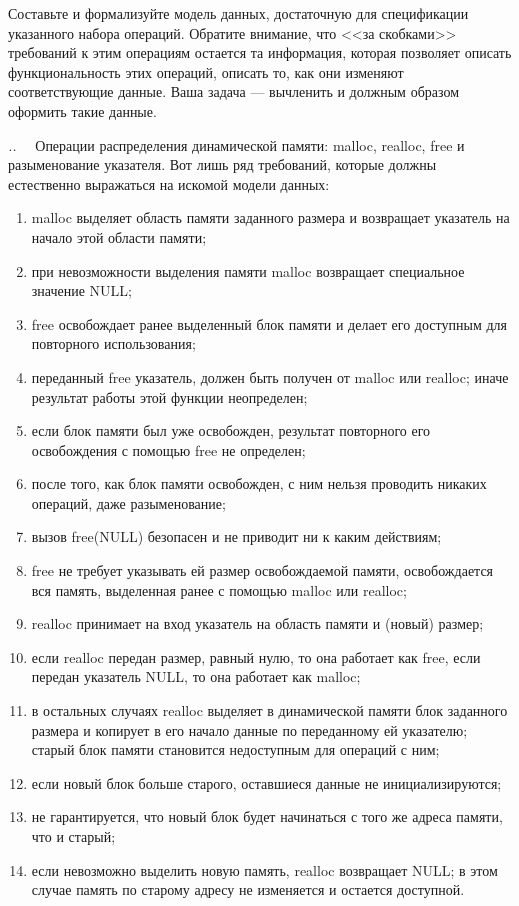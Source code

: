 \documentclass[14pt, twoside]{extreport}
\newcounter{problem_type}[chapter]
\newcounter{zadacha}[problem_type]
\newcommand{\z}{\vspace{0.5cm}\par\addtocounter{zadacha}{1}%
\textit{\arabic{chapter}.\arabic{problem_type}.\arabic{zadacha}}~~  }
\begin{document}
Составьте и формализуйте модель данных, достаточную для спецификации указанного набора операций. Обратите внимание, что <<за скобками>> требований к этим операциям остается та информация, которая позволяет описать функциональность этих операций, описать то, как они изменяют соответствующие данные. Ваша задача --- вычленить и должным образом оформить такие данные.

\z Операции распределения динамической памяти: malloc, realloc, free и разыменование указателя. Вот лишь ряд требований, которые должны естественно выражаться на искомой модели данных:
\begin{enumerate}
  \item malloc выделяет область памяти заданного размера и возвращает указатель на начало этой области памяти;
  \item при невозможности выделения памяти malloc возвращает специальное значение NULL;
  \item free освобождает ранее выделенный блок памяти и делает его доступным для повторного использования;
  \item переданный free указатель, должен быть получен от malloc или realloc; иначе результат работы этой функции неопределен;
  \item если блок памяти был уже освобожден, результат повторного его освобождения с помощью free не определен;
  \item после того, как блок памяти освобожден, с ним нельзя проводить никаких операций, даже разыменование;
  \item вызов free(NULL) безопасен и не приводит ни к каким действиям;
  \item free не требует указывать ей размер освобождаемой памяти, освобождается вся память, выделенная ранее с помощью malloc или realloc;
  \item realloc принимает на вход указатель на область памяти и (новый) размер;
  \item если realloc передан размер, равный нулю, то она работает как free, если передан указатель NULL, то она работает как malloc;
  \item в остальных случаях realloc выделяет в динамической памяти блок заданного размера и копирует в его начало данные по переданному ей указателю; старый блок памяти становится недоступным для операций с ним;
  \item если новый блок больше старого, оставшиеся данные не инициализируются;
  \item не гарантируется, что новый блок будет начинаться с того же адреса памяти, что и старый;
  \item если невозможно выделить новую память, realloc возвращает NULL; в этом случае память по старому адресу не изменяется и остается доступной.
\end{enumerate}
\end{document}

